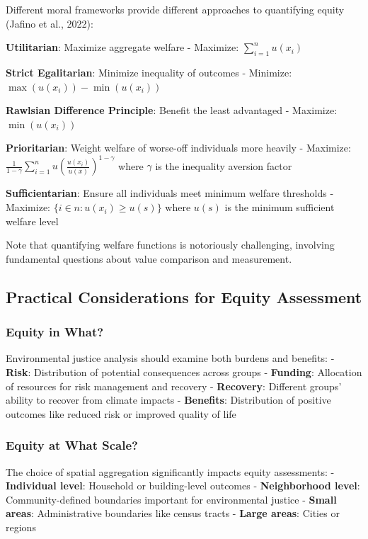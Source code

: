 \documentclass[
  letterpaper,
  DIV=11,
  numbers=noendperiod]{scrreprt}
\begin{document}
Different moral frameworks provide different approaches to quantifying
equity (Jafino et al., 2022):

\textbf{Utilitarian}: Maximize aggregate welfare - Maximize:
\(\sum_{i=1}^n u(x_i)\)

\textbf{Strict Egalitarian}: Minimize inequality of outcomes - Minimize:
\(\max(u(x_i)) - \min(u(x_i))\)

\textbf{Rawlsian Difference Principle}: Benefit the least advantaged -
Maximize: \(\min(u(x_i))\)

\textbf{Prioritarian}: Weight welfare of worse-off individuals more
heavily - Maximize:
\(\frac{1}{1-\gamma} \sum_{i=1}^n u(\frac{u(x_i)}{u(\bar{x})})^{1-\gamma}\)
where \(\gamma\) is the inequality aversion factor

\textbf{Sufficientarian}: Ensure all individuals meet minimum welfare
thresholds - Maximize: \(\{i \in n : u(x_i) \geq u(s)\}\) where \(u(s)\)
is the minimum sufficient welfare level

Note that quantifying welfare functions is notoriously challenging,
involving fundamental questions about value comparison and measurement.

\subsection{Practical Considerations for Equity
Assessment}\label{practical-considerations-for-equity-assessment}

\subsubsection{Equity in What?}\label{equity-in-what}

Environmental justice analysis should examine both burdens and benefits:
- \textbf{Risk}: Distribution of potential consequences across groups -
\textbf{Funding}: Allocation of resources for risk management and
recovery - \textbf{Recovery}: Different groups' ability to recover from
climate impacts - \textbf{Benefits}: Distribution of positive outcomes
like reduced risk or improved quality of life

\subsubsection{Equity at What Scale?}\label{equity-at-what-scale}

The choice of spatial aggregation significantly impacts equity
assessments: - \textbf{Individual level}: Household or building-level
outcomes - \textbf{Neighborhood level}: Community-defined boundaries
important for environmental justice - \textbf{Small areas}:
Administrative boundaries like census tracts - \textbf{Large areas}:
Cities or regions
\end{document}
